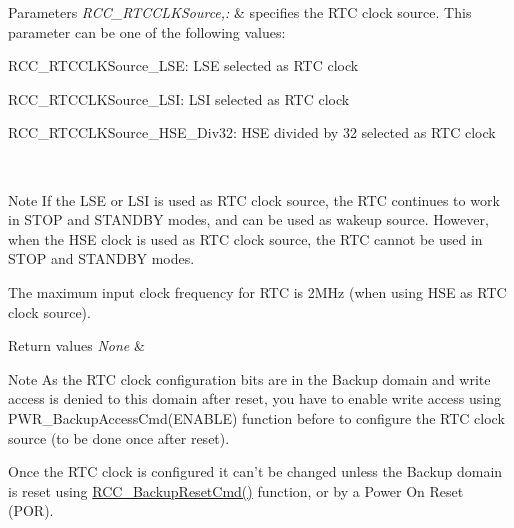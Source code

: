 \begin{DoxyParams}{Parameters}
{\em R\-C\-C\-\_\-\-R\-T\-C\-C\-L\-K\-Source,\-:} & specifies the R\-T\-C clock source. This parameter can be one of the following values\-: \begin{DoxyItemize}
\item R\-C\-C\-\_\-\-R\-T\-C\-C\-L\-K\-Source\-\_\-\-L\-S\-E\-: L\-S\-E selected as R\-T\-C clock \item R\-C\-C\-\_\-\-R\-T\-C\-C\-L\-K\-Source\-\_\-\-L\-S\-I\-: L\-S\-I selected as R\-T\-C clock \item R\-C\-C\-\_\-\-R\-T\-C\-C\-L\-K\-Source\-\_\-\-H\-S\-E\-\_\-\-Div32\-: H\-S\-E divided by 32 selected as R\-T\-C clock\end{DoxyItemize}
\\
\hline
\end{DoxyParams}
\begin{DoxyNote}{Note}
If the L\-S\-E or L\-S\-I is used as R\-T\-C clock source, the R\-T\-C continues to work in S\-T\-O\-P and S\-T\-A\-N\-D\-B\-Y modes, and can be used as wakeup source. However, when the H\-S\-E clock is used as R\-T\-C clock source, the R\-T\-C cannot be used in S\-T\-O\-P and S\-T\-A\-N\-D\-B\-Y modes. 

The maximum input clock frequency for R\-T\-C is 2\-M\-Hz (when using H\-S\-E as R\-T\-C clock source). 
\end{DoxyNote}

\begin{DoxyRetVals}{Return values}
{\em None} & \\
\hline
\end{DoxyRetVals}
\begin{DoxyNote}{Note}
As the R\-T\-C clock configuration bits are in the Backup domain and write access is denied to this domain after reset, you have to enable write access using P\-W\-R\-\_\-\-Backup\-Access\-Cmd(\-E\-N\-A\-B\-L\-E) function before to configure the R\-T\-C clock source (to be done once after reset). 

Once the R\-T\-C clock is configured it can't be changed unless the Backup domain is reset using \hyperlink{group___r_c_c___exported___functions_ga636c3b72f35391e67f12a551b15fa54a}{R\-C\-C\-\_\-\-Backup\-Reset\-Cmd()} function, or by a Power On Reset (P\-O\-R).
\end{DoxyNote}


